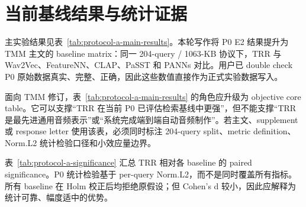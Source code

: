 \chapter{当前基线结果与统计证据}
\label{chap:results}

主实验结果见表~\ref{tab:protocol-a-main-results}。本轮写作将 P0 E2 结果提升为 TMM 主文的 baseline matrix：同一 204-query / 1063-KB 协议下，TRR 与 Wav2Vec、FeatureNN、CLAP、PaSST 和 PANNs 对比。用户已 double check P0 原始数据真实、完整、正确，因此这些数值直接作为正式实验数据写入。

面向 TMM 修订，表~\ref{tab:protocol-a-main-results} 的角色应升级为 objective core table。它可以支撑“TRR 在当前 P0 已评估检索基线中更强”，但不能支撑“TRR 是最先进通用音频表示”或“系统完成端到端自动音频制作”。若主文、supplement 或 response letter 使用该表，必须同时标注 204-query split、metric definition、Norm.L2 统计检验口径和小效应量边界。

\begin{table}[H]
	\centering
			\caption{P0 Protocol-A 主结果。L2 与 Norm.L2 越低越好，其余指标越高越好。}
		\label{tab:protocol-a-main-results}
		\scriptsize
	\end{table}

		表~\ref{tab:protocol-a-significance} 汇总 TRR 相对各 baseline 的 paired significance。P0 统计检验基于 per-query Norm.L2，而不是同时覆盖所有指标。所有 baseline 在 Holm 校正后均拒绝原假设；但 Cohen's d 较小，因此应解释为统计可靠、幅度适中的优势。

